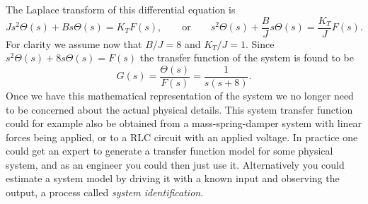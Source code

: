 \documentclass[10pt]{beamer}
\begin{document}
The Laplace transform of this differential equation is
\begin{equation*}
  J s^2 \Theta(s) + B s \Theta(s) = K_T F(s), \qquad \text{or} \qquad 
  s^2 \Theta(s) + \frac{B}{J} s \Theta(s) = \frac{K_T}{J} F(s).
\end{equation*}
For clarity we assume now that $B/J = 8$ and $K_T/J = 1$.   Since $s^2 \Theta(s) + 8 s \Theta(s) = F(s)$ the transfer function of the system is found to be
\begin{equation*}
  G(s) = \frac{\Theta(s)}{F(s)} = \frac{1}{s(s+8)}.
\end{equation*}
Once we have this mathematical representation of the system we no longer need to be concerned about the actual physical details.  This system transfer function could for example also be obtained from a mass-spring-damper system with linear forces being applied, or to a RLC circuit with an applied voltage.  In practice one could get an expert to generate a transfer function model for some physical system, and as an engineer you could then just use it.  Alternatively you could estimate a system model by driving it with a known input and observing the output, a process called {\em system identification}.
\end{document}
